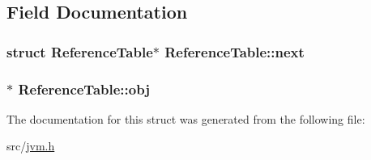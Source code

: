 \subsection{Field Documentation}
\subsubsection[{\texorpdfstring{next}{next}}]{\setlength{\rightskip}{0pt plus 5cm}struct {\bf Reference\+Table}$\ast$ Reference\+Table\+::next}\hypertarget{structReferenceTable_aa640983e7b43b0062fad4ca7c4b16dd4}{}\label{structReferenceTable_aa640983e7b43b0062fad4ca7c4b16dd4}
\subsubsection[{\texorpdfstring{obj}{obj}}]{$\ast$ Reference\+Table\+::obj}\hypertarget{structReferenceTable_a7730da3973b57f3c86c6007b9a90e7f8}{}\label{structReferenceTable_a7730da3973b57f3c86c6007b9a90e7f8}


The documentation for this struct was generated from the following file\+:\begin{DoxyCompactItemize}
\item 
src/\hyperlink{jvm_8h}{jvm.\+h}\end{DoxyCompactItemize}

